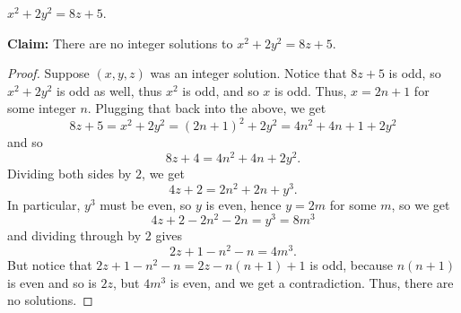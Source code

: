 \documentclass[11pt,dvipsnames]{book}
\numberwithin{figure}{section} %
\numberwithin{table}{section} %
\begin{document}
\begin{exercise}
 $x^2+2y^2=8z+5$.

\begin{solution}

{\bf Claim:} There are no integer solutions to $x^2+2y^2=8z+5$.

\begin{proof}
Suppose $(x,y,z)$ was an integer solution. Notice that $8z+5$ is odd, so $x^2+2y^2$ is odd as well, thus $x^2$ is odd, and so $x$ is odd. Thus, $x=2n+1$ for some integer $n$. Plugging that back into the above, we get
\[
8z+5 =x^2+2y^2 = (2n+1)^2 +2y^2 = 4n^2 +4n+1 + 2y^2\]
and so
\[
8z+4 = 4n^2+4n+2y^2.\]
Dividing both sides by $2$, we get
\[
4z+2=2n^2+2n+y^3.\]
In particular, $y^3$ must be even, so $y$ is even, hence $y=2m$ for some $m$, so we get
\[
4z+2-2n^2-2n=y^3=8m^3
\]
and dividing through by $2$ gives
\[
2z+1-n^2-n = 4m^3.\]
But notice that $2z+1-n^2-n = 2z-n(n+1)+1$ is odd, because $n(n+1)$ is even and so is $2z$, but $4m^3$ is even, and we get a contradiction. Thus, there are no solutions.
\end{proof}
\end{solution}
\end{exercise}
\end{document}
